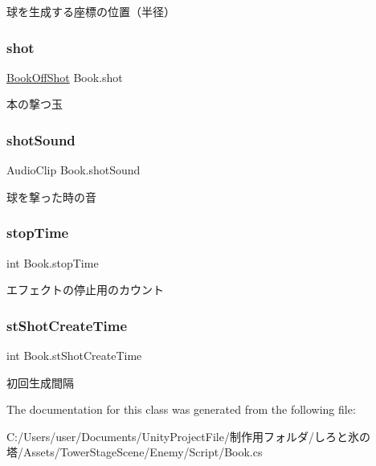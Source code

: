 球を生成する座標の位置（半径） 

\mbox{\label{class_book_a6bdde0825229953d0ca01c5f8155640c}} 
\subsubsection{\texorpdfstring{shot}{shot}}
{\footnotesize\ttfamily \hyperlink{class_book_off_shot}{Book\+Off\+Shot} Book.\+shot\hspace{0.3cm}{\ttfamily [private]}}



本の撃つ玉 

\mbox{\label{class_book_adf12a76c0251881fb97b7d3b4ee147f2}} 
\subsubsection{\texorpdfstring{shot\+Sound}{shotSound}}
{\footnotesize\ttfamily Audio\+Clip Book.\+shot\+Sound\hspace{0.3cm}{\ttfamily [private]}}



球を撃った時の音 

\mbox{\label{class_book_abb3b0df54a256fdd22ca78d1806772d1}} 
\subsubsection{\texorpdfstring{stop\+Time}{stopTime}}
{\footnotesize\ttfamily int Book.\+stop\+Time\hspace{0.3cm}{\ttfamily [private]}}



エフェクトの停止用のカウント 

\mbox{\label{class_book_a132afd5c2381c6b72abb611b29e9cecc}} 
\subsubsection{\texorpdfstring{st\+Shot\+Create\+Time}{stShotCreateTime}}
{\footnotesize\ttfamily int Book.\+st\+Shot\+Create\+Time\hspace{0.3cm}{\ttfamily [private]}}



初回生成間隔 



The documentation for this class was generated from the following file\+:\begin{DoxyCompactItemize}
\item 
C\+:/\+Users/user/\+Documents/\+Unity\+Project\+File/制作用フォルダ/しろと氷の塔/\+Assets/\+Tower\+Stage\+Scene/\+Enemy/\+Script/Book.\+cs\end{DoxyCompactItemize}
